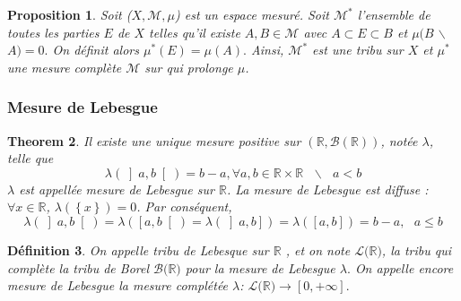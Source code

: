 \documentclass[3pt]{article}
\newtheorem{theorem}{Theorem}
\newtheorem{definition}[theorem]{D\'{e}finition}
\newtheorem{proposition}[theorem]{Proposition}
\begin{document}
\bigskip

\begin{proposition}
Soit ($X,\mathcal{M},\mu $) est un espace mesur\'{e}. Soit $\mathcal{M}%
^{\ast }$ l'ensemble de toutes les parties $E$ de $X$ telles qu'il existe $%
A,B\in \mathcal{M}$ avec $A\subset E\subset B$ et $\mu (B$ $\backslash $ $%
A)=0.$ On d\'{e}finit alors $\mu ^{\ast }(E)=\mu (A).$ Ainsi, $\mathcal{M}%
^{\ast }$ est une tribu sur $X$ et $\mu ^{\ast }$ une mesure compl\`{e}te $%
\mathcal{M}$ sur qui prolonge $\mu $.
\end{proposition}

\subsubsection{Mesure de Lebesgue}

\bigskip

\begin{theorem}
Il existe une unique mesure positive sur $(\mathbb{R},\mathcal{B(\mathbb{R})}%
)$, not\'{e}e $\lambda $, telle que 
\begin{equation*}
\lambda (\left] a,b\right[ )=b-a,\forall a,b\in \mathbb{R}\times \mathbb{R}%
\text{ }\backslash \text{ }a<b
\end{equation*}%
$\lambda $ est appell\'{e}e mesure de Lebesgue sur $\mathbb{R}$. La mesure
de Lebesgue est diffuse : $\forall x\in \mathbb{R}$, $\lambda (\left\{
x\right\} )=0$. Par cons\'{e}quent,%
\begin{equation*}
\lambda (\left] a,b\right[ )=\lambda (\left[ a,b\right[ )=\lambda (\left] a,b%
\right] )=\lambda (\left[ a,b\right] )=b-a,\text{ }a\leq b
\end{equation*}
\end{theorem}

\bigskip

\begin{definition}
On appelle tribu de Lebesque sur $\mathbb{R}$ , et on note $\mathcal{L(}%
\mathbb{R}\mathcal{)}$, la tribu qui compl\`{e}te la tribu de Borel $%
\mathcal{B(}\mathbb{R}\mathcal{)}$ pour la mesure de Lebesgue $\lambda .$ On
appelle encore mesure de Lebesgue la mesure compl\'{e}t\'{e}e $\lambda $: $%
\mathcal{L(}\mathbb{R}\mathcal{)\rightarrow }\left[ 0,+\infty \right] .$
\end{definition}

\bigskip
\end{document}

